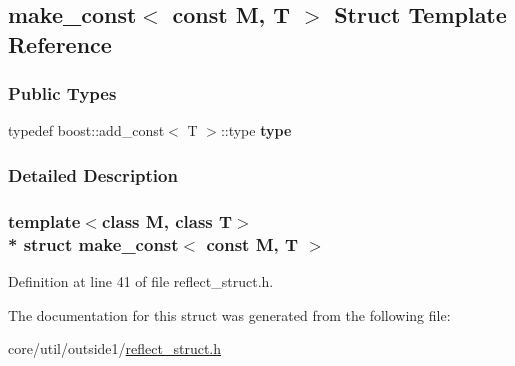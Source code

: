 \hypertarget{structmake__const_3_01const_01M_00_01T_01_4}{}\subsection{make\+\_\+const$<$ const M, T $>$ Struct Template Reference}
\label{structmake__const_3_01const_01M_00_01T_01_4}
\subsubsection*{Public Types}
\begin{DoxyCompactItemize}
\item 
typedef boost\+::add\+\_\+const$<$ T $>$\+::type {\bfseries type}\hypertarget{structmake__const_3_01const_01M_00_01T_01_4_a186d9f865f213ef62783b686f335630a}{}\label{structmake__const_3_01const_01M_00_01T_01_4_a186d9f865f213ef62783b686f335630a}

\end{DoxyCompactItemize}


\subsubsection{Detailed Description}
\subsubsection*{template$<$class M, class T$>$\\*
struct make\+\_\+const$<$ const M, T $>$}



Definition at line 41 of file reflect\+\_\+struct.\+h.



The documentation for this struct was generated from the following file\+:\begin{DoxyCompactItemize}
\item 
core/util/outside1/\hyperlink{reflect__struct_8h}{reflect\+\_\+struct.\+h}\end{DoxyCompactItemize}
